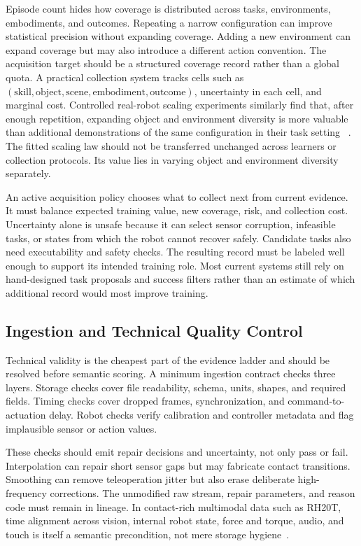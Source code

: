 Episode count hides how coverage is distributed across tasks, environments, embodiments, and outcomes.
Repeating a narrow configuration can improve statistical precision without expanding coverage.
Adding a new environment can expand coverage but may also introduce a different action convention.
The acquisition target should be a structured coverage record rather than a global quota.
A practical collection system tracks cells such as $(\text{skill},\text{object},\text{scene}, \text{embodiment},\text{outcome})$, uncertainty in each cell, and marginal cost.
Controlled real-robot scaling experiments similarly find that, after enough repetition, expanding object and environment diversity is more valuable than additional demonstrations of the same configuration in their task setting ~\cite{lin2024data_2410_18647}.
The fitted scaling law should not be transferred unchanged across learners or collection protocols.
Its value lies in varying object and environment diversity separately.

An active acquisition policy chooses what to collect next from current evidence.
It must balance expected training value, new coverage, risk, and collection cost.
Uncertainty alone is unsafe because it can select sensor corruption, infeasible tasks, or states from which the robot cannot recover safely.
Candidate tasks also need executability and safety checks.
The resulting record must be labeled well enough to support its intended training role.
Most current systems still rely on hand-designed task proposals and success filters rather than an estimate of which additional record would most improve training.

\subsection{Ingestion and Technical Quality Control}

Technical validity is the cheapest part of the evidence ladder and should be resolved before semantic scoring.
A minimum ingestion contract checks three layers.
Storage checks cover file readability, schema, units, shapes, and required fields.
Timing checks cover dropped frames, synchronization, and command-to-actuation delay.
Robot checks verify calibration and controller metadata and flag implausible sensor or action values.

These checks should emit repair decisions and uncertainty, not only pass or fail.
Interpolation can repair short sensor gaps but may fabricate contact transitions.
Smoothing can remove teleoperation jitter but also erase deliberate high-frequency corrections.
The unmodified raw stream, repair parameters, and reason code must remain in lineage.
In contact-rich multimodal data such as RH20T, time alignment across vision, internal robot state, force and torque, audio, and touch is itself a semantic precondition, not mere storage hygiene~\cite{fang2023rh20t_2307_00595}.

